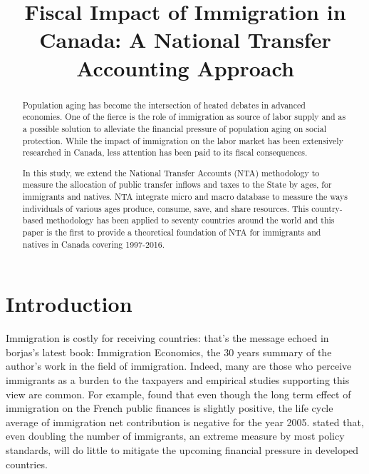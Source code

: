 


\title{Fiscal Impact of Immigration in Canada: A National Transfer Accounting Approach}
\author{}
\date{}


\maketitle
\begin{abstract}
  Population aging has become the intersection of heated debates in advanced economies. One of the fierce is the role of immigration as source of labor supply and as a possible solution to alleviate the financial pressure of population aging on social protection. While the impact of immigration on the labor market has been extensively researched in Canada, less attention has been paid to its fiscal consequences.

  \vspace{0.7em}\par
  In this study, we extend the National Transfer Accounts (NTA) methodology to measure the allocation of public transfer inflows and taxes to the State by ages, for immigrants and natives. NTA integrate micro and macro database to measure the ways individuals of various ages produce, consume, save, and share resources. This country-based methodology has been applied to seventy countries around the world and this paper is the first to provide a theoretical foundation of NTA for immigrants and natives in Canada covering 1997-2016.

\end{abstract}

  \section*{Introduction}\label{sec:into}
  Immigration is costly for receiving countries: that's the message echoed in borjas's latest book: Immigration Economics, the 30 years summary of the author's work in the field of immigration\citep{Card:2016ku}. Indeed, many are those who perceive immigrants as a burden to the taxpayers and empirical studies supporting this view are common. For example, \citet{Chojnicki:2011vu} found that even though the long term effect of immigration on the French public finances is slightly positive, the life cycle average of immigration net contribution is negative for the year 2005. \citet{Fehr:2003gq} stated that, even doubling the number of immigrants, an extreme measure by most policy standards, will do little to mitigate the upcoming financial pressure in developed countries.

